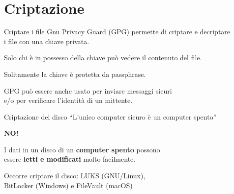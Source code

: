
\section{Criptazione}

\begin{myframe}{Criptare i file}
  Gnu Privacy Guard (GPG) permette di criptare e decriptare\\ i file con una chiave privata.

  \medskip\pause
  Solo chi è in possesso della chiave può vedere il contenuto del file.

  \medskip\pause
  Solitamente la chiave è protetta da passphrase.

  \medskip\pause
  GPG può essere anche usato per inviare messaggi sicuri\\ e/o per verificare l'identità di un mittente.
\end{myframe}

\begin{myframe}{Criptazione del disco}
  ``L'unico computer sicuro è un computer spento''

  \medskip\pause
  {\Huge\textbf{NO!}}
  \medskip\pause

  I dati in un disco di un \textbf{computer spento} possono\\ essere \textbf{letti e modificati} molto facilmente.

  \medskip\pause
  Occorre criptare il disco: LUKS (GNU/Linux),\\ BitLocker (Windows) e FileVault (macOS)
\end{myframe}




